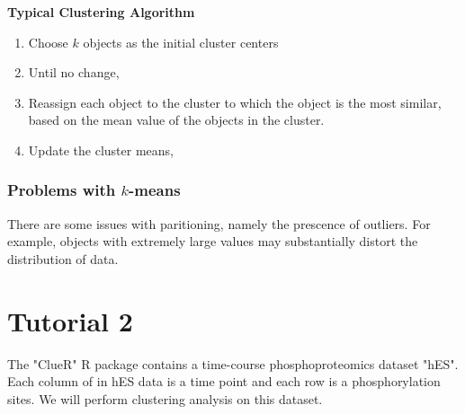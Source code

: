 \documentclass[twoside]{article}
\theoremstyle{definition}
\theoremstyle{definition}
\begin{document}
\begin{dBox}
	\textbf{Typical Clustering Algorithm}
	\begin{enumerate}
		\item Choose $k$ objects as the initial cluster centers
		\item Until no change, 
		\item Reassign each object to the cluster to which the object is the most similar, based on the mean value of the objects in the cluster.
		\item Update the cluster means, 
	\end{enumerate}
\end{dBox}

\subsubsection{Problems with $k$-means}
There are some issues with paritioning, namely the prescence of outliers. For example, objects with extremely large values may substantially distort the distribution of data. 

\section{Tutorial 2}

The "ClueR" R package contains a time-course phosphoproteomics dataset "hES". Each
column of in hES data is a time point and each row is a phosphorylation sites. We will
perform clustering analysis on this dataset.
\end{document}
